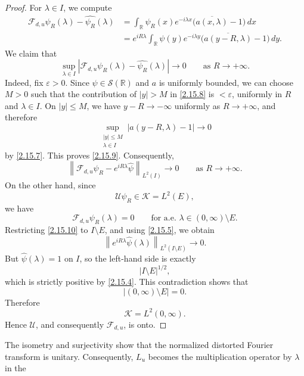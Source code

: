 \documentclass[10pt]{article}
\numberwithin{equation}{section}
\numberwithin{theorem}{section}
\begin{document}
\begin{proof}
For \(\lambda\in I\), we compute
\begin{equation}
\label{2.15.8}
\begin{aligned}
\mathcal F_{d,u}\psi_R(\lambda)-\widehat{\psi_R}(\lambda)
&=
\int_{\mathbb R}
\psi_R(x)e^{-i\lambda x}
\bigl(\overline{a(x,\lambda)}-1\bigr)\,dx  \\
&=
e^{iR\lambda}
\int_{\mathbb R}
\psi(y)e^{-i\lambda y}
\bigl(\overline{a(y-R,\lambda)}-1\bigr)\,dy .
\end{aligned}
\end{equation}
We claim that
\begin{equation}
\label{2.15.9}
\sup_{\lambda\in I}
\left|
\mathcal F_{d,u}\psi_R(\lambda)-\widehat{\psi_R}(\lambda)
\right|
\longrightarrow0
\qquad\text{as }R\to+\infty.
\end{equation}
Indeed, fix \(\varepsilon>0\). Since \(\psi\in\mathcal S(\mathbb R)\) and \(a\) is
uniformly bounded, we can choose \(M>0\) such that the contribution of \(|y|>M\) in
\eqref{2.15.8} is \(<\varepsilon\), uniformly in \(R\) and \(\lambda\in I\). On
\(|y|\le M\), we have \(y-R\to-\infty\) uniformly as \(R\to+\infty\), and therefore
\[
\sup_{\substack{|y|\le M\\ \lambda\in I}}
|a(y-R,\lambda)-1|\to0
\]
by \eqref{2.15.7}. This proves \eqref{2.15.9}. Consequently,
\begin{equation}
\label{2.15.10}
\left\|
\mathcal F_{d,u}\psi_R-e^{iR\lambda}\widehat\psi
\right\|_{L^2(I)}
\longrightarrow0
\qquad\text{as }R\to+\infty.
\end{equation}
On the other hand, since
\[
\mathcal U\psi_R\in\mathcal K=L^2(E),
\]
we have
\begin{equation}
\label{2.15.11}
\mathcal F_{d,u}\psi_R(\lambda)=0
\qquad\text{for a.e. }\lambda\in(0,\infty)\setminus E.
\end{equation}
Restricting \eqref{2.15.10} to \(I\setminus E\), and using \eqref{2.15.5}, we obtain
\[
\left\|
e^{iR\lambda}\widehat\psi(\lambda)
\right\|_{L^2(I\setminus E)}
\longrightarrow0.
\]
But \(\widehat\psi(\lambda)=1\) on \(I\), so the left-hand side is exactly
\[
|I\setminus E|^{1/2},
\]
which is strictly positive by \eqref{2.15.4}. This contradiction shows that
\[
|(0,\infty)\setminus E|=0.
\]
Therefore
\[
\mathcal K=L^2(0,\infty).
\]
Hence \(\mathcal U\), and consequently \(\mathcal F_{d,u}\), is onto.
\end{proof}
The isometry and surjectivity show that the normalized distorted Fourier transform is
unitary. Consequently, \(L_u\) becomes the multiplication operator by \(\lambda\) in the
\end{document}
